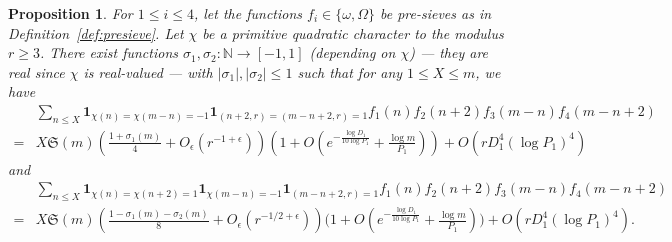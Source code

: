 \documentclass[12pt]{amsart}
\newtheorem{proposition}[theorem]{Proposition}
\theoremstyle{definition}
\theoremstyle{remark}
\numberwithin{equation}{section}
\newcommand{\1}{\mathbf{1}}
\begin{document}
\begin{proposition}\label{prop_fundlem_exceptional}
 For $1\leq i \leq 4$, let the functions $f_i\in \{ \omega, \Omega \}$ be pre-sieves as in Definition~\ref{def:presieve}. Let  $\chi$ be a primitive quadratic character to the modulus $r
 \geq 3$. There exist functions $\sigma_1, \sigma_2\colon \mathbb{N}\to [-1,1]$ (depending on $\chi$) --- they are real since $\chi$ is real-valued --- with $|\sigma_1|,|\sigma_2|\leq 1$ such that for any $1\leq X\leq m$, we have
    \begin{align}
        \nonumber  &\sum_{n\leq X} \1_{\chi(n)=\chi(m-n)=-1}\1_{(n+2,r)=(m-n+2,r)=1} f_1(n)f_2(n+2) f_3(m-n)f_4(m-n+2)\\
		\label{eq_fundex_1}=& X \mathfrak{S}(m)\left(\frac{1+\sigma_1(m)}{4}+O_{\epsilon}(r^{-1+\epsilon})\right)\left(1+ O\left(e^{- \frac{\log D_1}{10 \log P_1}}+\frac{\log m}{P_1}\right)\right)+O(rD_1^4(\log P_1)^4) 
        \end{align}
        and
        \begin{align}
		\nonumber  &\sum_{n\leq X} \1_{\chi(n)=\chi(n+2)=1}\1_{\chi(m-n)=-1} \1_{(m-n+2,r)=1} f_1(n)f_2(n+2) f_3(m-n)f_4(m-n+2)\\
		\label{eq_fundex_2} =& X\mathfrak{S}(m)\left(\frac{1-\sigma_1(m)-\sigma_2(m)}{8}+O_{\epsilon}(r^{-1/2+\epsilon})\right)\bigl(1+ O(e^{- \frac{\log D_1}{10 \log P_1}}+\frac{\log m}{P_1})\bigr)+O(rD_1^4(\log P_1)^4).
	\end{align}
\end{proposition}
\end{document}
